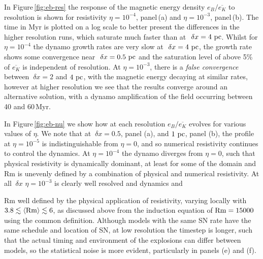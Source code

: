 \documentclass[preprint2]{aastex63}
\newcommand\Rm{{\rm Rm} }
\newcommand\SNr{\dot\sigma_{\rm sn}}
\newcommand\pc{~ {\rm pc}}
\newcommand\dx{~ {\delta x}}
\begin{document}
In Figure\,\ref{fig:eb-res} the response of the magnetic energy density 
$e_B/\overline{e_K}$ to resolution is shown for resistivity $\eta=10^{-4}$,
panel\,(a) and $\eta=10^{-3}$, panel\,(b).
The time in Myr is plotted on a log scale to better present the differences in 
the higher resolution runs, which saturate much faster than at $\dx=4\pc$.
Whilst for $\eta=10^{-4}$ the dynamo growth rates are very slow at $\dx=4\pc$,
the growth rate shows some convergence near $\dx=0.5\pc$ and the saturation
level of 
above 5\% of $\overline{e_K}$ is independent of resolution.
At $\eta=10^{-3}$, there is a \emph{false convergence} \citep{FMA91} between
$\dx=2$ and $4\pc$, with the magnetic energy decaying at similar rates, however
at higher resolution we see that the results converge around an alternative
solution, with a dynamo amplification of the field occurring between
40 and 60\,Myr.

In Figure\,\ref{fig:eb-nu} we show how at each resolution $e_B/\overline{e_K}$
evolves for various values of $\eta$.
We note that at $\dx=0.5$, panel (a), and $1\pc$, panel (b), the profile at
$\eta=10^{-5}$ is indistinguishable from $\eta=0$, and so numerical resistivity
continues to control the dynamics.
At $\eta=10^{-4}$ the dynamo diverges from $\eta=0$, such that physical
resistivity is dynamically dominant, at least for some of the domain and Rm is
unevenly defined by a combination of physical and numerical resistivity.
At all $\dx$ $\eta=10^{-3}$ is clearly well resolved and dynamics and

Rm well defined by the physical application of resistivity, varying locally with
$3.8\lesssim\langle\Rm\rangle\lesssim6$, as discussed above from the induction
equation of $\Rm=15000$ using the common definition. 
Although models with 
the same SN rate have the same schedule and location of
SN, at low resolution the timestep is longer, such that the actual timing and 
environment of the explosions can differ between models, so the statistical
noise is more evident, particularly in panels (e) and (f).
\end{document}
